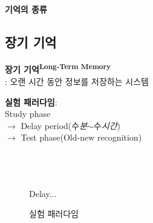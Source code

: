 \documentclass{beamer}
\begin{document}
\begin{frame}{\textbf{기억의 종류}}
\end{frame}

\subsection{장기 기억}
\begin{frame}{\textbf{장기 기억\textsuperscript{Long-Term Memory}}\\\large{: 오랜 시간 동안 정보를 저장하는 시스템}}
  \noindent
  \begin{minipage}{0.4\textwidth}
    \vspace{2em}
    \textbf{실험 패러다임}:\\
    Study phase \\$\rightarrow$ Delay period(수\textit{분}$\sim$수\textit{시간}) \\$\rightarrow$ Test phase(Old-new recognition)\\~\\~\\~\\
  \end{minipage}%
  \begin{minipage}{0.6\textwidth}
      \centering
      \begin{figure}
      \qquad
      Delay...
      \vspace{-0.5em}
      \caption{실험 패러다임}
    \end{figure}
  \end{minipage}\\

\end{frame}
\end{document}
